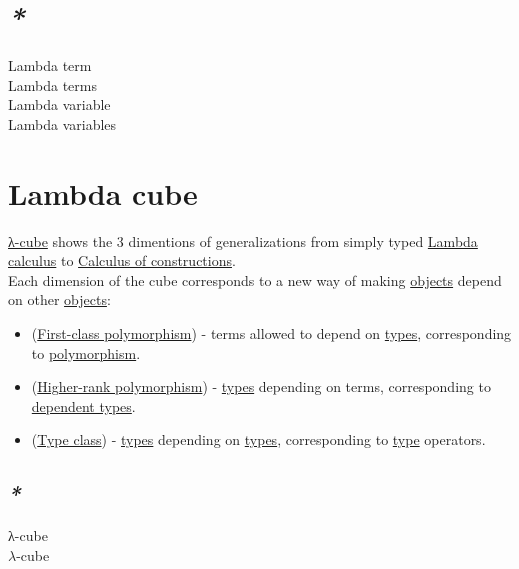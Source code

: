 \documentclass[a4paper,14pt,oneside]{book}
\begin{document}
\section{\emph{*}}
\label{sec:orgf5f520b}

\label{org0ab5a5f}Lambda term\\
\label{orgf847de2}Lambda terms\\
\label{org72f1dab}Lambda variable\\
\label{org61500e6}Lambda variables\\

\section{\label{org21d1411}Lambda cube}
\label{sec:org5baaf04}
\hyperref[org2cb6b2a]{λ-cube} shows the 3 dimentions of generalizations from simply typed \hyperref[org1fa2ea8]{Lambda calculus} to \hyperref[orgb0aaf3f]{Calculus of constructions}.\\

Each dimension of the cube corresponds to a new way of making \hyperref[org67f2abd]{objects} depend on other \hyperref[org67f2abd]{objects}:\\
\begin{itemize}
\item (\hyperref[orga81d526]{First-class polymorphism}) - terms allowed to depend on \hyperref[org47bd1c4]{types}, corresponding to \hyperref[org56e5e45]{polymorphism}.\\
\item (\hyperref[org517b53b]{Higher-rank polymorphism}) - \hyperref[org47bd1c4]{types} depending on terms, corresponding to \hyperref[orgb2be338]{dependent types}.\\
\item (\hyperref[org735fa3c]{Type class}) - \hyperref[org47bd1c4]{types} depending on \hyperref[org47bd1c4]{types}, corresponding to \hyperref[org35b9249]{type} operators.\\
\end{itemize}

\subsection{\emph{*}}
\label{sec:org12fa83f}

\label{org2cb6b2a}λ-cube\\
\label{orgb55fcb7}\(\lambda\)-cube\\
\end{document}
